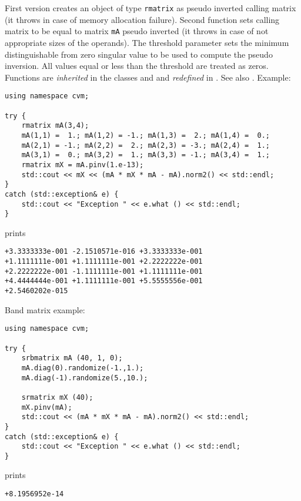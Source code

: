 First version creates an object of type \verb"rmatrix" as
 pseudo inverted calling matrix
(it throws 
in case of memory allocation failure).
Second function sets  calling matrix to be equal to  matrix
\verb"mA" pseudo inverted
(it throws 
in case of not appropriate sizes of the operands).
The threshold parameter sets  the minimum distinguishable
from zero singular value to be used to compute the pseudo inversion.
All values equal or less than the threshold are treated as zeros.
Functions are \emph{inherited} in the classes
 and 
and \emph{redefined} in .
See also .
Example:
\begin{Verbatim}
using namespace cvm;

try {
    rmatrix mA(3,4);
    mA(1,1) =  1.; mA(1,2) = -1.; mA(1,3) =  2.; mA(1,4) =  0.;
    mA(2,1) = -1.; mA(2,2) =  2.; mA(2,3) = -3.; mA(2,4) =  1.;
    mA(3,1) =  0.; mA(3,2) =  1.; mA(3,3) = -1.; mA(3,4) =  1.;
    rmatrix mX = mA.pinv(1.e-13);            
    std::cout << mX << (mA * mX * mA - mA).norm2() << std::endl;
}
catch (std::exception& e) {
    std::cout << "Exception " << e.what () << std::endl;
}
\end{Verbatim}
prints
\begin{Verbatim}
+3.3333333e-001 -2.1510571e-016 +3.3333333e-001
+1.1111111e-001 +1.1111111e-001 +2.2222222e-001
+2.2222222e-001 -1.1111111e-001 +1.1111111e-001
+4.4444444e-001 +1.1111111e-001 +5.5555556e-001
+2.5460202e-015
\end{Verbatim}
Band matrix example:
\begin{Verbatim}
using namespace cvm;

try {
    srbmatrix mA (40, 1, 0);
    mA.diag(0).randomize(-1.,1.);
    mA.diag(-1).randomize(5.,10.);

    srmatrix mX (40);
    mX.pinv(mA);
    std::cout << (mA * mX * mA - mA).norm2() << std::endl;
}
catch (std::exception& e) {
    std::cout << "Exception " << e.what () << std::endl;
}
\end{Verbatim}
prints
\begin{Verbatim}
+8.1956952e-14
\end{Verbatim}
\newpage



